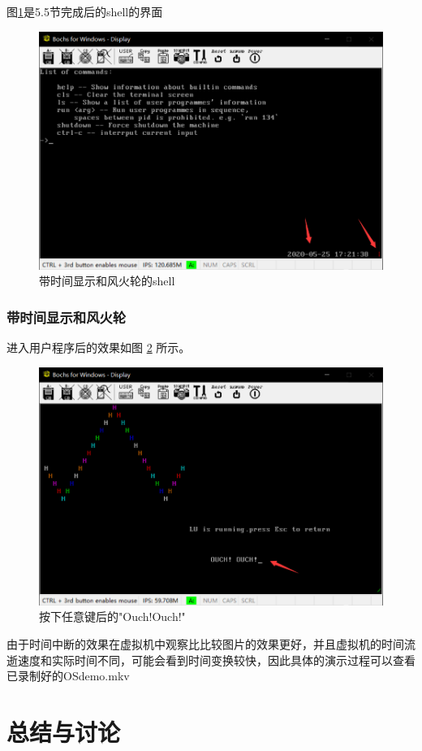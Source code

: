 \documentclass[a4paper, 11pt]{article} %
\begin{document}
图\ref{fig:wheelShell}是5.5节完成后的shell的界面
\begin{figure}[H]
  \centering
  \includegraphics[width=0.8\linewidth]{shellWithDate.png}
  \caption{带时间显示和风火轮的shell}
  \label{fig:wheelShell}
\end{figure}



\subsubsection{带时间显示和风火轮}
进入用户程序后的效果如图 \ref{fig:timeDisp} 所示。
\begin{figure}[H]
  \centering
  \includegraphics[width=0.8\linewidth]{ouch.png}
  \caption{按下任意键后的"Ouch!Ouch!"}
  \label{fig:timeDisp}
\end{figure}

由于时间中断的效果在虚拟机中观察比比较图片的效果更好，并且虚拟机的时间流逝速度和实际时间不同，可能会看到时间变换较快，因此具体的演示过程可以查看已录制好的OSdemo.mkv

\section{总结与讨论}
\end{document}
